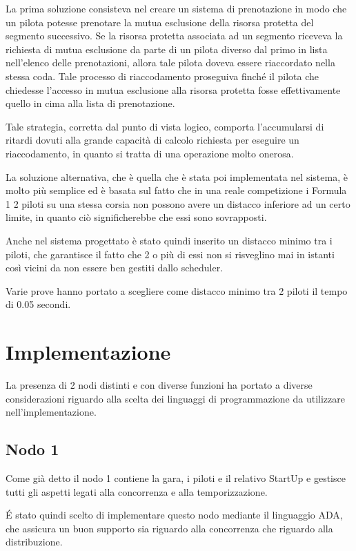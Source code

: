 \documentclass[a4paper,11pt, twoside]{book}
\begin{document}
      La prima soluzione consisteva nel creare un sistema di prenotazione in modo che un pilota potesse prenotare
      la mutua esclusione della risorsa protetta del segmento successivo. 
      Se la risorsa protetta associata ad un segmento riceveva la richiesta
      di mutua esclusione da parte di un pilota diverso dal primo in lista nell'elenco delle prenotazioni, allora tale pilota
      doveva essere riaccordato nella stessa coda. Tale processo di riaccodamento proseguiva finché il pilota
      che chiedesse l'accesso in mutua esclusione alla risorsa protetta fosse effettivamente quello in cima alla lista
      di prenotazione.
      
      Tale strategia, corretta dal punto di vista logico, comporta l'accumularsi di ritardi dovuti alla grande capacità
      di calcolo richiesta per eseguire un riaccodamento, in quanto si tratta di una operazione molto onerosa.
      
      La soluzione alternativa, che è quella che è stata poi implementata nel sistema, è molto più semplice
      ed è basata sul fatto che in una reale competizione i Formula 1 2 piloti su una stessa corsia
      non possono avere un distacco inferiore ad un certo limite, in quanto ciò significherebbe che essi sono sovrapposti.
      
      Anche nel sistema progettato è stato quindi inserito un distacco minimo tra i piloti, che garantisce 
      il fatto che 2 o più di essi non si risveglino mai in istanti così vicini da non essere ben gestiti 
      dallo scheduler.
      
      Varie prove hanno portato a scegliere come distacco minimo tra 2 piloti il tempo di 0.05 secondi.
	  
  \chapter{Implementazione}
    La presenza di 2 nodi distinti e con diverse funzioni ha portato a diverse considerazioni riguardo alla
    scelta dei linguaggi di programmazione da utilizzare nell'implementazione.
    
    \section {Nodo 1}
      Come già detto il nodo 1 contiene la gara, i piloti e il relativo StartUp e gestisce tutti gli aspetti
      legati alla concorrenza e alla temporizzazione.
      
      É stato quindi scelto di implementare questo nodo mediante il linguaggio ADA, che assicura un buon supporto sia
      riguardo alla concorrenza che riguardo alla distribuzione.
      
\end{document}
